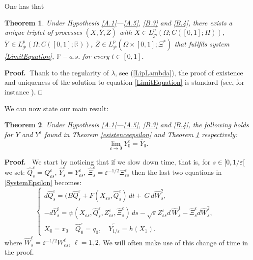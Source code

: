 \documentclass[reqno,a4paper,11 pt]{article}
\def \P {\mathcal{P}}
\def \e {\varepsilon}
\def \R {\mathbb{R}}
\newtheorem{theorem}{Theorem}[section]
\numberwithin{equation}{section}
\def\Dim{\noindent\hbox{{\bf Proof.}$\;\; $}}          %
\def\finedim{{\hfill\hbox{\enspace${ \square}$}} \smallskip}    %
\def\sqr#1#2{{\vcenter{\vbox{\hrule height .#2pt
     \hbox{\vrule width .#2pt height#1pt \kern#1pt \vrule
     width .#2pt} \hrule height .#2pt}}}}
\def\square{\mathchoice\sqr54\sqr54\sqr{4.1}3\sqr{3.5}3}
\begin{document}
 One has that
\begin{theorem} \label{esistencebar}Under Hypothesis \ref{A.1}---\ref{A.5}, \ref{B.3}  and \ref{B.4},
there exists a unique triplet of processes 
$(X,\bar{Y},\bar{Z})$ with $X\!\in L^p_{\mathcal{P}}(\Omega;C([0,1];H))$, $\bar{Y}\,\in L^p_{\mathcal{P}}(\Omega;C([0,1];\R))$, $\bar{Z}\!\in L^p_\P (\Omega\times [0,1];\Xi^*)$ that   fullfils system  \eqref{LimitEquation}, $\mathbb{P}-a.s.$  for every $ t\in [0,1]$.
\end{theorem}
\Dim Thank to the regularity of $\lambda$, see  (\ref{LipLambda}), the proof of existence and uniqueness of the solution to equation \eqref{LimitEquation} is standard (see, for instance \cite[Proposition 4.3]{FuTes}).
\finedim

We can now state our main result:
\begin{theorem}\label{main}
Under Hypothesis \ref{A.1}---\ref{A.5}, \ref{B.3}  and \ref{B.4}, the following holds for  $\bar{Y}$ and   $ Y^\e $ found in Theorem \ref{esistenceepsilon} and Theorem \ref{esistencebar}  respectively: 
\begin{equation}\label{Conv}
\lim_{\e \to 0} Y^\e _0 =\bar Y_0.
\end{equation}
\end{theorem}
\Dim
We start by noticing  that if we slow down time, that is, for $s\in [0,1/\e[$ we set:
 $\hat{Q}^{\e}_s=Q^{\e}_{\e s}$, 
  $\hat{Y}^{\e}_s=Y^{\e}_{\e s}$,
    $\hat{\Xi}^{\e}_s=\e^{-1/2}\Xi^{\e}_{\e s}$
    then  the last two equations in \eqref{SystemEpsilon} becomes:
 \begin{equation}\label{SystemEpsilonSlow}
\begin{cases}
  d\hat{Q}^\e_s= (B\hat{Q}^\e_s+ F(X_{\e s},\hat{Q}^\e_s) \,dt +   \,G \, d\hat{W}^2_s, &  \\ 
- d\hat{Y}^{\e}_s  =  \psi(X_{\e s},\hat{Q}^\e_s,{Z}^\e_{\e s}, \hat{\Xi}^\e_s) \,ds - \sqrt{\e} {Z}^\e_{\e s} d\, \hat{W}^1_s  - \hat{\Xi}^\e_s d\hat{W}_s^2, \\ 
X_0= x_0 \quad \hat{Q}^\e_0=q_0, \quad \hat{Y}^\e_{1/\e}=h(X_1).
\end{cases} 
\end{equation}
where  $\hat{W}_s^{\ell}={\e}^{-1/2}{W}_{\e s }^{\ell}$, $\ell=1,2$. We will often make use of this change of time in the proof.
\end{document}
